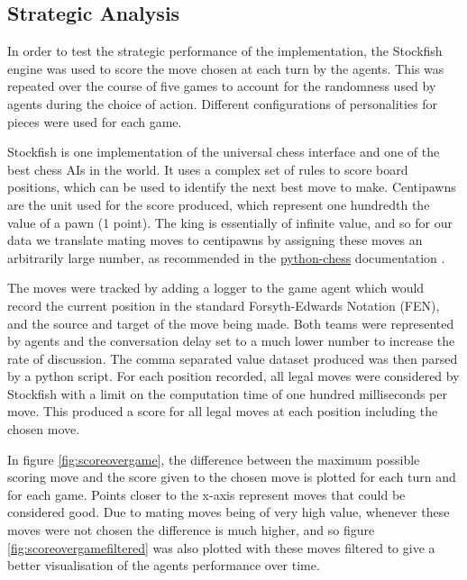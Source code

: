 \documentclass{article}
\begin{document}
\subsection{Strategic Analysis} \label{ss:sa}

In order to test the strategic performance of the implementation, the Stockfish engine \cite{stockfish} was used to score the move chosen at each turn by the agents. This was repeated over the course of five games to account for the randomness used by agents during the choice of action. Different configurations of personalities for pieces were used for each game.

Stockfish is one implementation of the universal chess interface and one of the best chess AIs in the world. It uses a complex set of rules to score board positions, which can be used to identify the next best move to make. Centipawns are the unit used for the score produced, which represent one hundredth the value of a pawn (1 point). The king is essentially of infinite value, and so for our data we translate mating moves to centipawns by assigning these moves an arbitrarily large number, as recommended in the \url{python-chess} documentation \cite{pythonchess}. 

The moves were tracked by adding a logger to the game agent which would record the current position in the standard Forsyth-Edwards Notation (FEN), and the source and target of the move being made. Both teams were represented by agents and the conversation delay set to a much lower number to increase the rate of discussion. The comma separated value dataset produced was then parsed by a python script. For each position recorded, all legal moves were considered by Stockfish with a limit on the computation time of one hundred milliseconds per move. This produced a score for all legal moves at each position including the chosen move.

In figure \ref{fig:scoreovergame}, the difference between the maximum possible scoring move and the score given to the chosen move is plotted for each turn and for each game. Points closer to the x-axis represent moves that could be considered good. Due to mating moves being of very high value, whenever these moves were not chosen the difference is much higher, and so figure \ref{fig:scoreovergamefiltered} was also plotted with these moves filtered to give a better visualisation of the agents performance over time.
\end{document}
